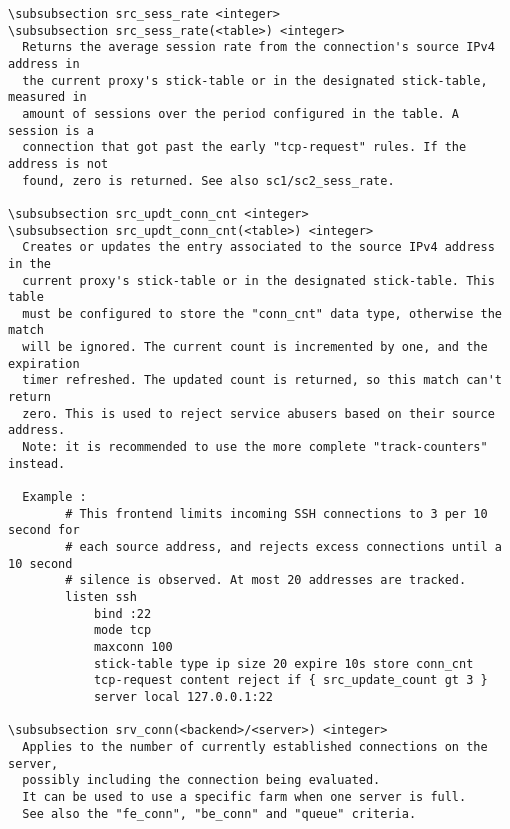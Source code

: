 \begin{verbatim}
\subsubsection src_sess_rate <integer>
\subsubsection src_sess_rate(<table>) <integer>
  Returns the average session rate from the connection's source IPv4 address in
  the current proxy's stick-table or in the designated stick-table, measured in
  amount of sessions over the period configured in the table. A session is a
  connection that got past the early "tcp-request" rules. If the address is not
  found, zero is returned. See also sc1/sc2_sess_rate.

\subsubsection src_updt_conn_cnt <integer>
\subsubsection src_updt_conn_cnt(<table>) <integer>
  Creates or updates the entry associated to the source IPv4 address in the
  current proxy's stick-table or in the designated stick-table. This table
  must be configured to store the "conn_cnt" data type, otherwise the match
  will be ignored. The current count is incremented by one, and the expiration
  timer refreshed. The updated count is returned, so this match can't return
  zero. This is used to reject service abusers based on their source address.
  Note: it is recommended to use the more complete "track-counters" instead.

  Example :
        # This frontend limits incoming SSH connections to 3 per 10 second for
        # each source address, and rejects excess connections until a 10 second
        # silence is observed. At most 20 addresses are tracked.
        listen ssh
            bind :22
            mode tcp
            maxconn 100
            stick-table type ip size 20 expire 10s store conn_cnt
            tcp-request content reject if { src_update_count gt 3 }
            server local 127.0.0.1:22

\subsubsection srv_conn(<backend>/<server>) <integer>
  Applies to the number of currently established connections on the server,
  possibly including the connection being evaluated.
  It can be used to use a specific farm when one server is full.
  See also the "fe_conn", "be_conn" and "queue" criteria.


\end{verbatim}
